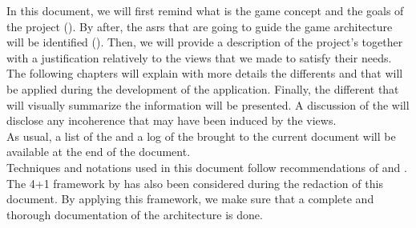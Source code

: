 In this document, we will first remind what is the game concept and the goals of the project (). By after, the \glspl{asr} that are going to guide the game architecture will be identified (). Then, we will provide a description of the project's  together with a justification relatively to the  views that we made to satisfy their needs. The following chapters will explain with more details the differents  and  that will be applied during the development of the application. Finally, the different  that will visually summarize the information will be presented. A discussion of the  will disclose any incoherence that may have been induced by the views. \\

As usual, a list of the  and a log of the  brought to the current document will be available at the end of the document.  \\

Techniques and notations used in this document follow recommendations of \cite{bass2013} and \cite{larman2005}. The 4+1 framework by \cite{4plus1} has also been considered during the redaction of this document. By applying this framework, we make sure that a complete and thorough documentation of the architecture is done.
